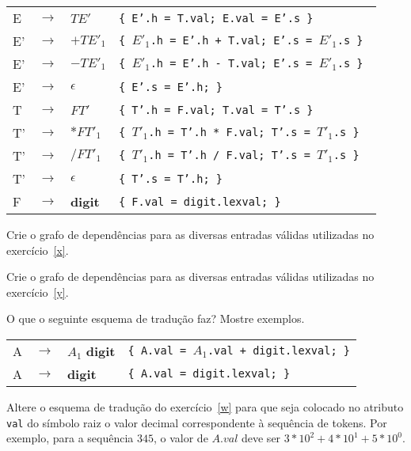 \documentclass{compiladores}
\begin{document}
\begin{listanumerada}
  \begin{tabular}{llll}
    E   &  $\rightarrow$  &  $TE'$           & \texttt{\{ E'.h = T.val; E.val = E'.s \} } \\
    E'  &  $\rightarrow$  &  $+TE'_1$        & \texttt{\{ $E'_1$.h = E'.h + T.val; E'.s = $E'_1$.s \} } \\
    E'  &  $\rightarrow$  &  $-TE'_1$        & \texttt{\{ $E'_1$.h = E'.h - T.val; E'.s = $E'_1$.s \} } \\
    E'  &  $\rightarrow$  &  $\epsilon$      &  \texttt{\{ E'.s = E'.h; \} }             \\
    T   &  $\rightarrow$  &  $FT'$           &  \texttt{\{ T'.h = F.val; T.val = T'.s \} }             \\
    T'  &  $\rightarrow$  &  $*FT'_1$        &  \texttt{\{ $T'_1$.h = T'.h * F.val; T'.s = $T'_1$.s \} }         \\
    T'  &  $\rightarrow$  &  $/FT'_1$        &  \texttt{\{ $T'_1$.h = T'.h / F.val; T'.s = $T'_1$.s \} }         \\
    T'  &  $\rightarrow$  &  $\epsilon$      &  \texttt{\{ T'.s = T'.h; \} }             \\
    F   &  $\rightarrow$  &  \textbf{digit}  &  \texttt{\{ F.val = digit.lexval; \} }     \\
  \end{tabular}

\item Crie o grafo de dependências para as diversas entradas válidas utilizadas no exercício~\ref{x}.

\item Crie o grafo de dependências para as diversas entradas válidas utilizadas no exercício~\ref{y}.

\item \label{w} O que o seguinte esquema de tradução faz? Mostre exemplos.

  \begin{tabular}{llll}
    A & $\rightarrow$ & $A_1$ {\bf digit} & \texttt{\{ A.val = $A_1$.val + digit.lexval; \}} \\
    A & $\rightarrow$ & {\bf digit} & \texttt{\{ A.val = digit.lexval; \}} \\
  \end{tabular}

\item \label{z} Altere o esquema de tradução do exercício~\ref{w} para que seja
  colocado no atributo \texttt{val} do símbolo raiz o valor decimal
  correspondente à sequência de tokens. Por exemplo, para a sequência
  $3 4 5$, o valor de $A.val$ deve ser $3*10^2 + 4 * 10^1 + 5 * 10^0$.


\end{listanumerada}
\end{document}
